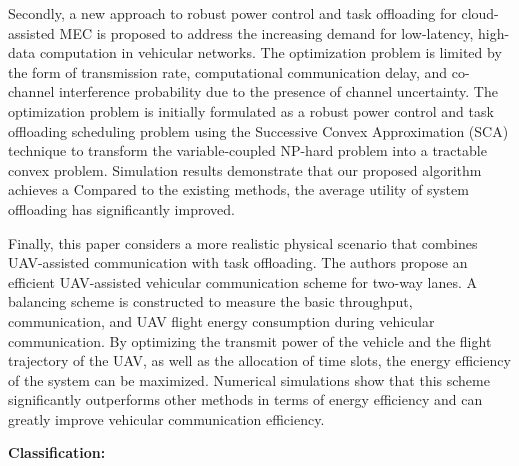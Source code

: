 {Secondly, a new approach to robust power control and task offloading for cloud-assisted MEC is proposed to address the increasing demand for low-latency, high-data computation in vehicular networks. The optimization problem is limited by the form of transmission rate, computational communication delay, and co-channel interference probability due to the presence of channel uncertainty. The optimization problem is initially formulated as a robust power control and task offloading scheduling problem using the Successive Convex Approximation (SCA) technique to transform the variable-coupled NP-hard problem into a tractable convex problem.   Simulation results demonstrate that our proposed algorithm achieves a Compared to the existing methods, the average utility of system offloading has significantly improved.

Finally, this paper considers a more realistic physical scenario that combines UAV-assisted communication with task offloading. The authors propose an efficient UAV-assisted vehicular communication scheme for two-way lanes. A balancing scheme is constructed to measure the basic throughput, communication, and UAV flight energy consumption during vehicular communication. By optimizing the transmit power of the vehicle and the flight trajectory of the UAV, as well as the allocation of time slots, the energy efficiency of the system can be maximized. Numerical simulations show that this scheme significantly outperforms other methods in terms of energy efficiency and can greatly improve vehicular communication efficiency.}

\begin{englishkeywords}
\myenkeywords
\end{englishkeywords}

\makeatletter
\noindent\textbf{Classification:} \CAST@value@UDC
\makeatother
\cleardoublepage%
\makeatletter
{}
\pagestyle{fancy}
  \fancyhf{}
\makeatother
